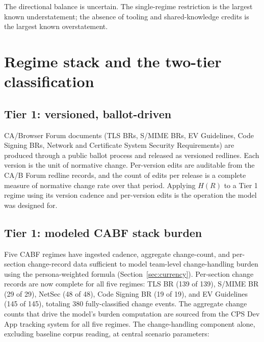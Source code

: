 \documentclass[11pt,letterpaper]{article}
\begin{document}
The directional balance is uncertain. The single-regime restriction is the largest known understatement; the absence of tooling and shared-knowledge credits is the largest known overstatement.

\section{Regime stack and the two-tier classification}
\label{sec:tiers}

\subsection{Tier 1: versioned, ballot-driven}
\label{sec:tier1-class}

CA/Browser Forum documents (TLS BRs, S/MIME BRs, EV Guidelines, Code Signing BRs, Network and Certificate System Security Requirements) are produced through a public ballot process and released as versioned redlines. Each version is the unit of normative change. Per-version edits are auditable from the CA/B Forum redline records, and the count of edits per release is a complete measure of normative change rate over that period. Applying $H(R)$ to a Tier 1 regime using its version cadence and per-version edits is the operation the model was designed for.

\subsection{Tier 1: modeled CABF stack burden}
\label{sec:tier1}

Five CABF regimes have ingested cadence, aggregate change-count, and per-section change-record data sufficient to model team-level change-handling burden using the persona-weighted formula (Section~\ref{sec:currency}). Per-section change records are now complete for all five regimes: TLS BR (139 of 139), S/MIME BR (29 of 29), NetSec (48 of 48), Code Signing BR (19 of 19), and EV Guidelines (145 of 145), totaling 380 fully-classified change events. The aggregate change counts that drive the model's burden computation are sourced from the CPS Dev App tracking system for all five regimes. The change-handling component alone, excluding baseline corpus reading, at central scenario parameters:
\end{document}
